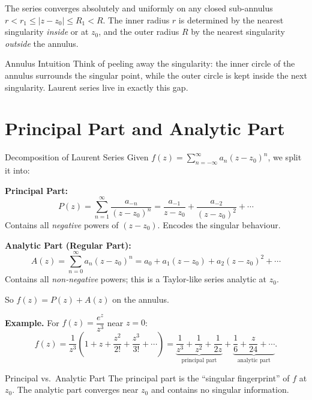\documentclass[12pt,a4paper]{article}
\begin{document}
The series converges absolutely and uniformly on any closed sub-annulus
$r < r_1 \leq |z-z_0| \leq R_1 < R$.
The inner radius $r$ is determined by the nearest singularity \emph{inside} or at $z_0$,
and the outer radius $R$ by the nearest singularity \emph{outside} the annulus.

\begin{learnbox}{Annulus Intuition}
Think of peeling away the singularity: the inner circle of the annulus surrounds the singular
point, while the outer circle is kept inside the next singularity. Laurent series live in
exactly this gap.
\end{learnbox}

\section{Principal Part and Analytic Part}

\begin{infobox}{Decomposition of Laurent Series}
Given $\displaystyle f(z) = \sum_{n=-\infty}^{\infty} a_n(z-z_0)^n$, we split it into:

\textbf{Principal Part:}
\[
  P(z) = \sum_{n=1}^{\infty} \frac{a_{-n}}{(z-z_0)^n}
       = \frac{a_{-1}}{z-z_0} + \frac{a_{-2}}{(z-z_0)^2} + \cdots
\]
Contains all \emph{negative} powers of $(z-z_0)$. Encodes the singular behaviour.

\textbf{Analytic Part (Regular Part):}
\[
  A(z) = \sum_{n=0}^{\infty} a_n(z-z_0)^n
       = a_0 + a_1(z-z_0) + a_2(z-z_0)^2 + \cdots
\]
Contains all \emph{non-negative} powers; this is a Taylor-like series analytic at $z_0$.

So $f(z) = P(z) + A(z)$ on the annulus.
\end{infobox}

\noindent\textbf{Example.} For $f(z)=\dfrac{e^z}{z^3}$ near $z=0$:
\[
  f(z) = \frac{1}{z^3}\left(1 + z + \frac{z^2}{2!} + \frac{z^3}{3!} + \cdots\right)
       = \underbrace{\frac{1}{z^3} + \frac{1}{z^2} + \frac{1}{2z}}_{\text{principal part}}
         + \underbrace{\frac{1}{6} + \frac{z}{24} + \cdots}_{\text{analytic part}}.
\]

\begin{learnbox}{Principal vs.\ Analytic Part}
The principal part is the ``singular fingerprint'' of $f$ at $z_0$. The analytic part
converges near $z_0$ and contains no singular information.
\end{learnbox}
\end{document}
